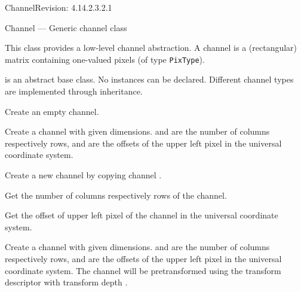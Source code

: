 \begin{manpage}{\libtitle}{Channel}{$ $Revision: 4.14.2.3.2.1 $ $}

\subtitle{Name}
    Channel --- Generic channel class


\subtitle{Description}
    This class provides a low-level channel abstraction. A channel is a
    (rectangular) matrix containing one-valued pixels (of type
    \texttt{PixType}).


\subtitle{Declaration}

     is an abstract base class. No instances
    can be declared.  Different channel types are implemented through
    inheritance.

    Create an empty channel.

    Create a channel with given dimensions.  and  are the
    number of columns respectively rows,  and  are the
    offsets of the upper left pixel in the universal coordinate system.

    Create a new channel by copying channel .


\subtitle{Public \\ Operations}

    Get the number of columns respectively rows of the channel.

    Get the offset of upper left pixel of the channel in the universal
    coordinate system.


\subtitle{Static \\ Operations}

    Create a channel with given dimensions.  and  are the
    number of columns respectively rows,  and  are
    the offsets of the upper left pixel in the universal coordinate system. The
    channel will be pretransformed using the transform descriptor
     with transform depth .


\end{manpage}
